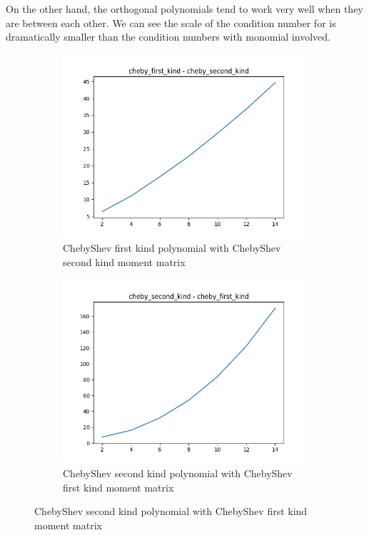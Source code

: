 \documentclass[12pt]{amsart}
\numberwithin{equation}{section}
\theoremstyle{definition}
\numberwithin{thm}{section}
\begin{document}
On the other hand, the orthogonal polynomials tend to work very well when they are between each other.
We can see the scale of the condition number for is dramatically smaller than the condition numbers with monomial involved. 

 \begin{figure}[h]
     \centering
     \begin{subfigure}[b]{0.475\textwidth}
         \centering
         \includegraphics[width=\textwidth]{imgs/cheby_first_kind_cheby_second_kind.png}
         \caption[ChebyShev First Kind polynomial with monomial moment matrix]%
         {\small ChebyShev first kind polynomial with ChebyShev second kind moment matrix}%

     \end{subfigure}
     \hfill
     \begin{subfigure}[b]{0.475\textwidth}  
         \centering 
         \includegraphics[width=\textwidth]{imgs/cheby_second_kind_cheby_first_kind.png}
         \caption[ChebyShev second kind polynomial with ChebyShev first kind moment matrix]%
         {\small ChebyShev second kind polynomial with ChebyShev first kind moment matrix}%
 

\end{subfigure}
\end{figure}
\end{document}

